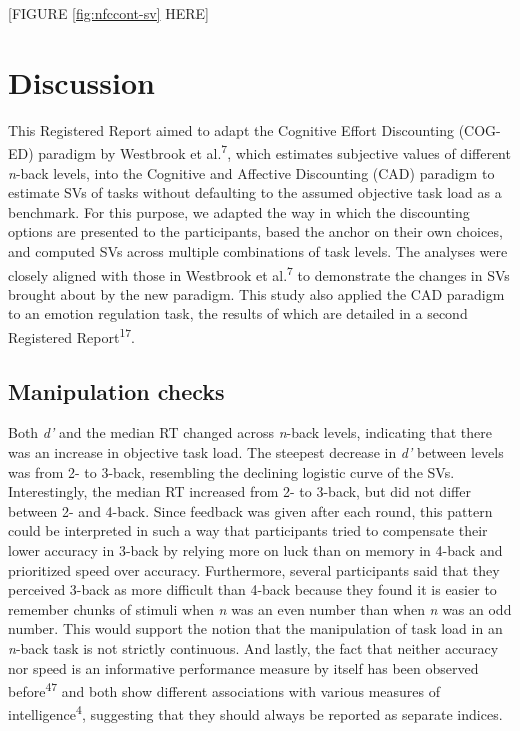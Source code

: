 \documentclass[
  man,floatsintext]{apa6}
\begin{document}
{[}FIGURE \ref{fig:nfccont-sv} HERE{]}

\hypertarget{discussion}{%
\section{Discussion}\label{discussion}}

This Registered Report aimed to adapt the Cognitive Effort Discounting (COG-ED) paradigm by Westbrook et al.\textsuperscript{7}, which estimates subjective values of different \emph{n}-back levels, into the Cognitive and Affective Discounting (CAD) paradigm to estimate SVs of tasks without defaulting to the assumed objective task load as a benchmark.
For this purpose, we adapted the way in which the discounting options are presented to the participants, based the anchor on their own choices, and computed SVs across multiple combinations of task levels.
The analyses were closely aligned with those in Westbrook et al.\textsuperscript{7} to demonstrate the changes in SVs brought about by the new paradigm.
This study also applied the CAD paradigm to an emotion regulation task, the results of which are detailed in a second Registered Report\textsuperscript{17}.

\hypertarget{manipulation-checks-1}{%
\subsection{Manipulation checks}\label{manipulation-checks-1}}

Both \emph{d'} and the median RT changed across \emph{n}-back levels, indicating that there was an increase in objective task load.
The steepest decrease in \emph{d'} between levels was from 2- to 3-back, resembling the declining logistic curve of the SVs.
Interestingly, the median RT increased from 2- to 3-back, but did not differ between 2- and 4-back.
Since feedback was given after each round, this pattern could be interpreted in such a way that participants tried to compensate their lower accuracy in 3-back by relying more on luck than on memory in 4-back and prioritized speed over accuracy.
Furthermore, several participants said that they perceived 3-back as more difficult than 4-back because they found it is easier to remember chunks of stimuli when \emph{n} was an even number than when \emph{n} was an odd number.
This would support the notion that the manipulation of task load in an \emph{n}-back task is not strictly continuous.
And lastly, the fact that neither accuracy nor speed is an informative performance measure by itself has been observed before\textsuperscript{47} and both show different associations with various measures of intelligence\textsuperscript{4}, suggesting that they should always be reported as separate indices.
\end{document}
